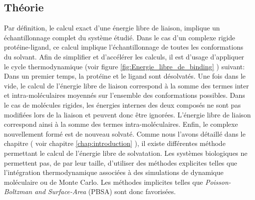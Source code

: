 \subsection{Théorie}
Par définition, le calcul exact d'une énergie libre de liaison, implique un échantillonnage complet du système étudié. Dans le cas d'un complexe rigide protéine-ligand, ce calcul implique l'échantillonnage de toutes les conformations du solvant. Afin de simplifier et d’accélérer les calculs, il est d'usage d'appliquer le cycle thermodynamique (voir figure \ref{fig:Energie_libre_de_binding} ) suivant: Dans un premier temps, la protéine et le ligand sont désolvatés. Une fois dans le vide, le calcul de l'énergie libre de liaison correspond à la somme des termes inter et intra-moléculaires moyennés sur l'ensemble des conformations possibles. Dans le cas de molécules rigides, les énergies internes des deux composés ne sont pas modifiées lors de la liaison et peuvent donc être ignorées. L'énergie libre de liaison correspond ainsi à la somme des termes intra-moléculaires. Enfin, le complexe nouvellement formé est de nouveau solvaté. Comme nous l'avons détaillé dans le chapitre ( voir chapitre \ref{chap:introduction} ), il existe différentes méthode permettant le calcul de l'énergie libre de solvatation. Les systèmes biologiques ne permettent pas, de par leur taille, d'utiliser des méthodes explicites telles que l'intégration thermodynamique associées à des simulations de dynamique moléculaire ou de Monte Carlo. Les méthodes implicites telles que \textit{Poisson-Boltzman and Surface-Area} (PBSA) sont donc favorisées.



